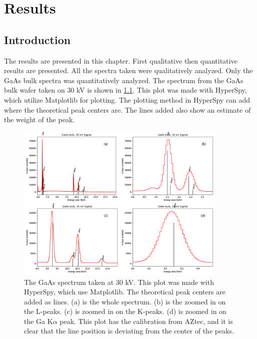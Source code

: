 \chapter{Results}
\label{chap:results}




\section{Introduction}
\label{sec:results:intro}
The results are presented in this chapter.
First qualitative then quantitative results are presented.
All the spectra taken were qualitatively analyzed.
Only the GaAs bulk spectra was quantitatively analyzed.
The spectrum from the GaAs bulk wafer taken on 30 kV is shown in \cref{fig:GaAs30kV_HS}.
This plot was made with HyperSpy, which utilize Matplotlib for plotting.
The plotting method in HyperSpy can add where the theoretical peak centers are.
The lines added also show an estimate of the weight of the peak.


\begin{figure}
    \centering
    \includegraphics[width=0.90\textwidth]{figures/GaAs30kV_HS.png}
    \caption{
        The GaAs spectrum taken at 30 kV.
        This plot was made with HyperSpy, which use Matplotlib.
        The theoretical peak centers are added as lines.
        (a) is the whole spectrum.
        (b) is the zoomed in on the L-peaks.
        (c) is zoomed in on the K-peaks.
        (d) is zoomed in on the Ga K$\alpha$ peak.
        This plot has the calibration from AZtec, and it is clear that the line position is deviating from the center of the peaks.
    }
    \label{fig:GaAs30kV_HS}
\end{figure}




